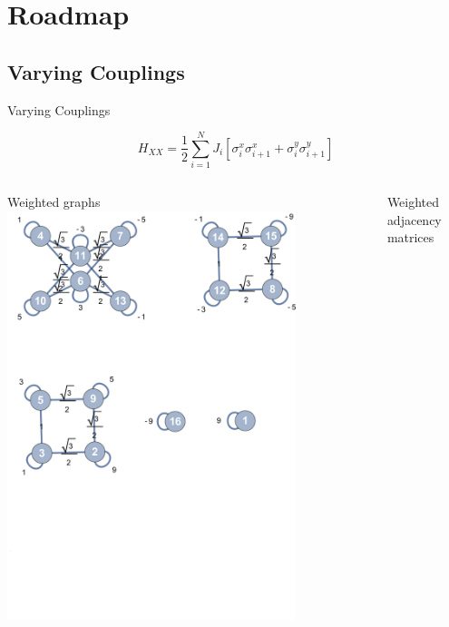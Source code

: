 \documentclass{beamer}
\begin{document}
\section{Roadmap}
\subsection{Varying Couplings}
\begin{frame}[t]{Varying Couplings}
	\begin{exampleblock}{}
	\setlength\abovedisplayskip{-8pt}
	\begin{center}
		\[H_{XX}=\frac{1}{2}\sum_{i=1}^{N}{J_i\left[\sigma_i^x\sigma_{i+1}^x + \sigma_i^y\sigma_{i+1}^y\right]}\]
	\end{center}
	\end{exampleblock}
	\begin{columns}[T]
		\begin{column}{0.5\textwidth}
			\centering
			Weighted graphs
   			\includegraphics[trim=0mm 0 0 0mm, width=0.8\textwidth]{Images/graph_vary}
		\end{column}
		\begin{column}{0.5\textwidth}
			\centering
			Weighted adjacency matrices

\end{column}
\end{columns}
\end{frame}
\end{document}
